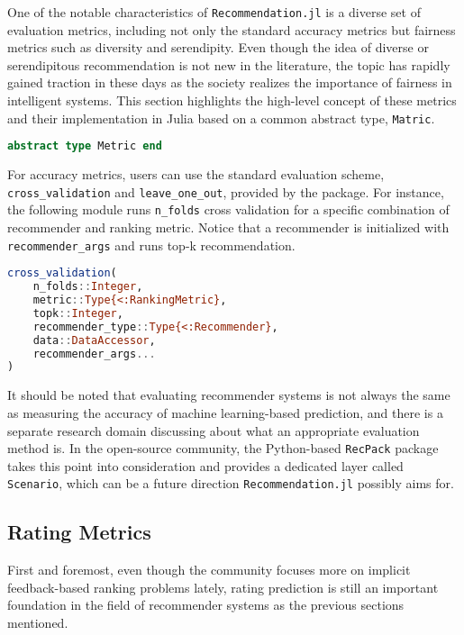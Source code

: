 One of the notable characteristics of \texttt{Recommendation.jl} is a diverse set of evaluation metrics, including not only the standard accuracy metrics but fairness metrics such as diversity and serendipity. Even though the idea of diverse or serendipitous recommendation is not new in the literature, the topic has rapidly gained traction in these days as the society realizes the importance of fairness in intelligent systems. This section highlights the high-level concept of these metrics and their implementation in Julia based on a common abstract type, \texttt{Matric}.

\begin{lstlisting}[language = Julia]
abstract type Metric end
\end{lstlisting}  

For accuracy metrics, users can use the standard evaluation scheme, \texttt{cross\_validation} and \texttt{leave\_one\_out}, provided by the package. For instance, the following module runs \texttt{n\_folds} cross validation for a specific combination of recommender and ranking metric. Notice that a recommender is initialized with \texttt{recommender\_args} and runs top-k recommendation.

\begin{lstlisting}[language = Julia]
cross_validation(
    n_folds::Integer,
    metric::Type{<:RankingMetric},
    topk::Integer,
    recommender_type::Type{<:Recommender},
    data::DataAccessor,
    recommender_args...
)
\end{lstlisting}

It should be noted that evaluating recommender systems is not always the same as measuring the accuracy of machine learning-based prediction, and there is a separate research domain discussing about what an appropriate evaluation method is. In the open-source community, the Python-based \texttt{RecPack} package \cite{michiels2022recpack} takes this point into consideration and provides a dedicated layer called \texttt{Scenario}, which can be a future direction \texttt{Recommendation.jl} possibly aims for.

\subsection{Rating Metrics}

First and foremost, even though the community focuses more on implicit feedback-based ranking problems lately, rating prediction is still an important foundation in the field of recommender systems as the previous sections mentioned.


